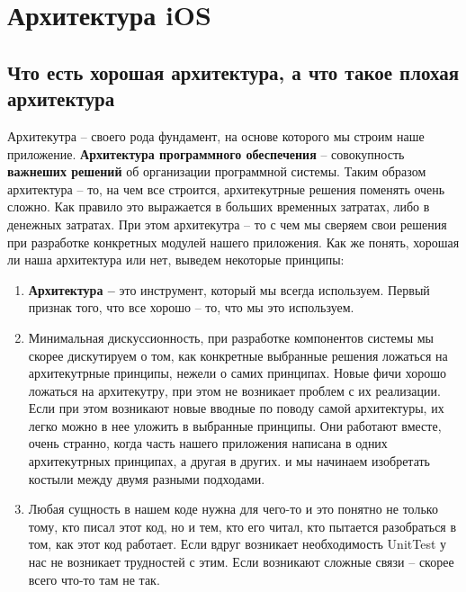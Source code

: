 \documentclass{article}
\begin{document}
    \section{Архитектура iOS}
    \subsection{Что есть хорошая архитектура, а что такое плохая архитектура}
    Архитекутра -- своего рода фундамент, на основе которого мы строим наше приложение. \textbf{Архитектура программного обеспечения} -- совокупность \textbf{важнеших решений} об организации программной системы. 
    \newline
    Таким образом архитектура -- то, на чем все строится, архитекутрные решения поменять очень сложно. Как правило это выражается в больших временных затратах, либо в денежных затратах. 
    \newline
    При этом архитекутра -- то с чем мы сверяем свои решения при разработке конкретных модулей нашего приложения. 
    \newline
    Как же понять, хорошая ли наша архитектура или нет, выведем некоторые принципы: 
    \begin{enumerate}
        \item \textbf{Архитектура --} это инструмент, который мы всегда используем. Первый признак того, что все хорошо -- то, что мы это используем. 
        \item  Минимальная дискуссионность, при разработке компонентов системы мы скорее дискутируем о том, как конкретные выбранные решения ложаться на архитекутрные принципы, нежели о самих принципах. Новые фичи хорошо ложаться на архитекутру, при этом не возникает проблем с их реализации. Если при этом возникают новые вводные по поводу самой архитектуры, их легко можно в нее уложить в выбранные принципы. 
        \newline
        Они работают вместе, очень странно, когда часть нашего приложения написана в одних архитекутрных принципах, а другая в других. и мы начинаем изобретать костыли между двумя разными подходами. 
        \item  Любая сущность в нашем коде нужна для чего-то и это понятно не только тому, кто писал этот код, но и тем, кто его читал, кто пытается разобраться в том, как этот код работает. Если вдруг возникает необходимость UnitTest у нас не возникает трудностей с этим. Если возникают сложные связи -- скорее всего что-то там не так. 
        \newline
        
    \end{enumerate}
\end{document}
